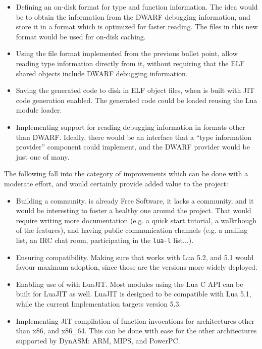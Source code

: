 \begin{itemize}

	\item Defining an on-disk format for type and function information. The
	idea would be to obtain the information from the DWARF debugging
	information, and store it in a format which is optimized for faster
	reading. The files in this new format would be used for on-disk caching.

	\item Using the file format implemented from the previous bullet point,
	allow reading type information directly from it, without requiring that
	the ELF shared objects include DWARF debugging information.

	\item Saving the generated code to disk in ELF object files, when \Eol* is
	built with JIT code generation enabled.	The generated code could be loaded
	reusing the Lua module loader.

	\item Implementing support for reading debugging information in formats
	other than DWARF. Ideally, there would be an interface that a “type
	information provider” component could implement, and the DWARF provider
	would be just one of many.

\end{itemize}

The following fall into the category of improvements which can be done with
a moderate effort, and would certainly provide added value to the project:


\begin{itemize}

	\item Building a community. \Eol* is already Free Software, it lacks
	a community, and it would be interesting to foster a healthy one around
	the project. That would require writing more documentation (e.g. a quick
	start tutorial, a walkthough of the features), and having public
	communication channels (e.g. a mailing list, an \gls{IRC} chat room,
	participating in the \verb|lua-l| list...).

	\item Ensuring compatibility. Making sure that \Eol* works with Lua 5.2,
	and	5.1 would favour maximum adoption, since those are the versions more
	widely deployed.

	\item Enabling use of \Eol* with LuaJIT. Most modules using the Lua C API
	can be built for LuaJIT as well. LuaJIT is designed to be compatible with
	Lua	5.1, while the current Implementation targets version 5.3.

	\item Implementing JIT compilation of function invocations for
	architectures other than x86, and x86\_64. This can be done with ease for
	the other architectures supported by DynASM: ARM, MIPS, and PowerPC.

\end{itemize}

\beforeintro
